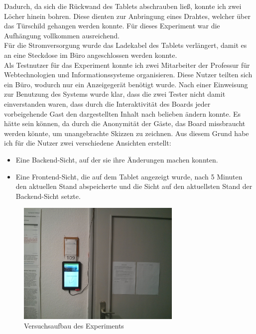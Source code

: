 Dadurch, da sich die Rückwand des Tablets abschrauben ließ, konnte ich zwei Löcher hinein bohren. Diese dienten zur Anbringung eines Drahtes, welcher über das Türschild gehangen werden konnte. Für dieses Experiment war die Aufhängung vollkommen ausreichend.
\\
Für die Stromversorgung wurde das Ladekabel des Tablets verlängert, damit es an eine Steckdose im Büro angeschlossen werden konnte.
\\
Als Testnutzer für das Experiment konnte ich zwei Mitarbeiter der Professur für Webtechnologien und Informationssysteme organisieren.
Diese Nutzer teilten sich ein Büro, wodurch nur ein Anzeigegerät benötigt wurde. Nach einer Einweisung zur Benutzung des Systems wurde klar, dass die zwei Tester nicht damit einverstanden waren, dass durch die Interaktivität des Boards jeder vorbeigehende Gast den dargestellten Inhalt nach belieben ändern konnte. Es hätte sein können, da durch die Anonymität der Gäste, das Board missbraucht werden könnte, um unangebrachte Skizzen zu zeichnen.
Aus diesem Grund habe ich für die Nutzer zwei verschiedene Ansichten erstellt:
\begin{itemize}
  \item Eine Backend-Sicht, auf der sie ihre Änderungen machen konnten.
  \item Eine Frontend-Sicht, die auf dem Tablet angezeigt wurde, nach 5 Minuten den aktuellen Stand abspeicherte und die Sicht auf den aktuellsten Stand der Backend-Sicht setzte.
\end{itemize}
\begin{figure}[h!]
  \centering
    \includegraphics[width=0.7\textwidth]{./img/experiment01.jpg}
  \caption{Versuchsaufbau des Experiments}
  \label{img:experiment01}
\end{figure}



